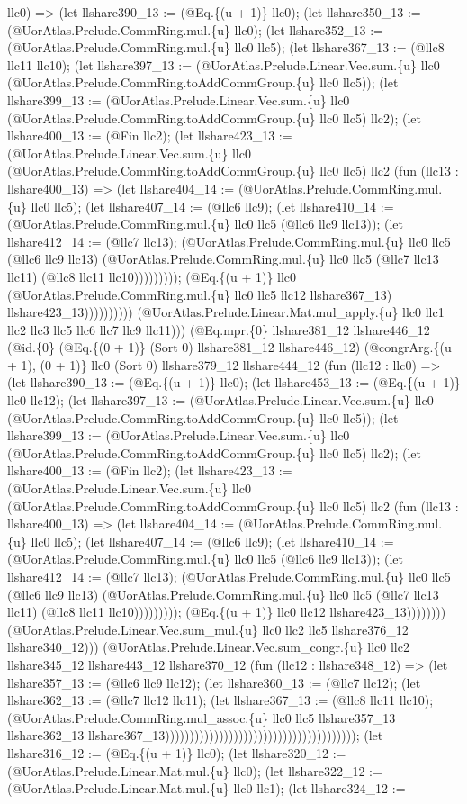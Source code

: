 \documentclass[11pt]{article}
\begin{document}
llc0) => (let llshare390\_13 := (@Eq.\{(u + 1)\} llc0); (let llshare350\_13 := (@UorAtlas.Prelude.CommRing.mul.\{u\} llc0); (let llshare352\_13 := (@UorAtlas.Prelude.CommRing.mul.\{u\} llc0 llc5); (let llshare367\_13 := (@llc8 llc11 llc10); (let llshare397\_13 := (@UorAtlas.Prelude.Linear.Vec.sum.\{u\} llc0 (@UorAtlas.Prelude.CommRing.toAddCommGroup.\{u\} llc0 llc5)); (let llshare399\_13 := (@UorAtlas.Prelude.Linear.Vec.sum.\{u\} llc0 (@UorAtlas.Prelude.CommRing.toAddCommGroup.\{u\} llc0 llc5) llc2); (let llshare400\_13 := (@Fin llc2); (let llshare423\_13 := (@UorAtlas.Prelude.Linear.Vec.sum.\{u\} llc0 (@UorAtlas.Prelude.CommRing.toAddCommGroup.\{u\} llc0 llc5) llc2 (fun (llc13 : llshare400\_13) => (let llshare404\_14 := (@UorAtlas.Prelude.CommRing.mul.\{u\} llc0 llc5); (let llshare407\_14 := (@llc6 llc9); (let llshare410\_14 := (@UorAtlas.Prelude.CommRing.mul.\{u\} llc0 llc5 (@llc6 llc9 llc13)); (let llshare412\_14 := (@llc7 llc13); (@UorAtlas.Prelude.CommRing.mul.\{u\} llc0 llc5 (@llc6 llc9 llc13) (@UorAtlas.Prelude.CommRing.mul.\{u\} llc0 llc5 (@llc7 llc13 llc11) (@llc8 llc11 llc10))))))))); (@Eq.\{(u + 1)\} llc0 (@UorAtlas.Prelude.CommRing.mul.\{u\} llc0 llc5 llc12 llshare367\_13) llshare423\_13)))))))))) (@UorAtlas.Prelude.Linear.Mat.mul\_apply.\{u\} llc0 llc1 llc2 llc3 llc5 llc6 llc7 llc9 llc11))) (@Eq.mpr.\{0\} llshare381\_12 llshare446\_12 (@id.\{0\} (@Eq.\{(0 + 1)\} (Sort 0) llshare381\_12 llshare446\_12) (@congrArg.\{(u + 1), (0 + 1)\} llc0 (Sort 0) llshare379\_12 llshare444\_12 (fun (llc12 : llc0) => (let llshare390\_13 := (@Eq.\{(u + 1)\} llc0); (let llshare453\_13 := (@Eq.\{(u + 1)\} llc0 llc12); (let llshare397\_13 := (@UorAtlas.Prelude.Linear.Vec.sum.\{u\} llc0 (@UorAtlas.Prelude.CommRing.toAddCommGroup.\{u\} llc0 llc5)); (let llshare399\_13 := (@UorAtlas.Prelude.Linear.Vec.sum.\{u\} llc0 (@UorAtlas.Prelude.CommRing.toAddCommGroup.\{u\} llc0 llc5) llc2); (let llshare400\_13 := (@Fin llc2); (let llshare423\_13 := (@UorAtlas.Prelude.Linear.Vec.sum.\{u\} llc0 (@UorAtlas.Prelude.CommRing.toAddCommGroup.\{u\} llc0 llc5) llc2 (fun (llc13 : llshare400\_13) => (let llshare404\_14 := (@UorAtlas.Prelude.CommRing.mul.\{u\} llc0 llc5); (let llshare407\_14 := (@llc6 llc9); (let llshare410\_14 := (@UorAtlas.Prelude.CommRing.mul.\{u\} llc0 llc5 (@llc6 llc9 llc13)); (let llshare412\_14 := (@llc7 llc13); (@UorAtlas.Prelude.CommRing.mul.\{u\} llc0 llc5 (@llc6 llc9 llc13) (@UorAtlas.Prelude.CommRing.mul.\{u\} llc0 llc5 (@llc7 llc13 llc11) (@llc8 llc11 llc10))))))))); (@Eq.\{(u + 1)\} llc0 llc12 llshare423\_13)))))))) (@UorAtlas.Prelude.Linear.Vec.sum\_mul.\{u\} llc0 llc2 llc5 llshare376\_12 llshare340\_12))) (@UorAtlas.Prelude.Linear.Vec.sum\_congr.\{u\} llc0 llc2 llshare345\_12 llshare443\_12 llshare370\_12 (fun (llc12 : llshare348\_12) => (let llshare357\_13 := (@llc6 llc9 llc12); (let llshare360\_13 := (@llc7 llc12); (let llshare362\_13 := (@llc7 llc12 llc11); (let llshare367\_13 := (@llc8 llc11 llc10); (@UorAtlas.Prelude.CommRing.mul\_assoc.\{u\} llc0 llc5 llshare357\_13 llshare362\_13 llshare367\_13))))))))))))))))))))))))))))))))))))))); (let llshare316\_12 := (@Eq.\{(u + 1)\} llc0); (let llshare320\_12 := (@UorAtlas.Prelude.Linear.Mat.mul.\{u\} llc0); (let llshare322\_12 := (@UorAtlas.Prelude.Linear.Mat.mul.\{u\} llc0 llc1); (let llshare324\_12 := 
\end{document}
